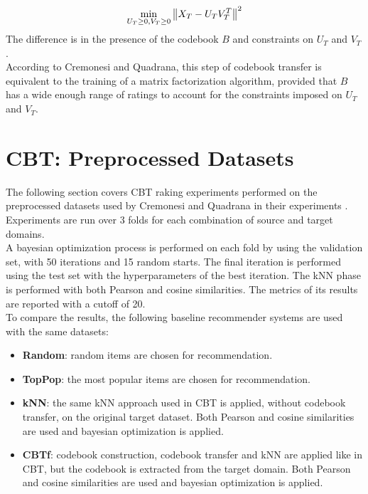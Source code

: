 \begin{equation*}
\min_{U_T \geq 0, V_T \geq 0} \left\lVert X_T - U_T V_T^T\right\rVert^2
\end{equation*}
The difference is in the presence of the codebook $B$ and constraints on $U_T$ and $V_T$.\\
According to Cremonesi and Quadrana, this step of codebook transfer is equivalent to the training of a matrix factorization algorithm, provided that $B$ has a wide enough range of ratings to account for the constraints imposed on $U_T$ and $V_T$.



\section{CBT: Preprocessed Datasets}

The following section covers CBT raking experiments performed on the preprocessed datasets used by Cremonesi and Quadrana in their experiments \cite{10.1145/2645710.2645769}.\\
Experiments are run over 3 folds for each combination of source and target domains.\\
A bayesian optimization process is performed on each fold by using the validation set, with 50 iterations and 15 random starts. The final iteration is performed using the test set with the hyperparameters of the best iteration. The kNN phase is performed with both Pearson and cosine similarities. The metrics of its results are reported with a cutoff of 20.\\
To compare the results, the following baseline recommender systems are used with the same datasets:
\begin{itemize}
\item \textbf{Random}: random items are chosen for recommendation.
\item \textbf{TopPop}: the most popular items are chosen for recommendation.
\item \textbf{kNN}: the same kNN approach used in CBT is applied, without codebook transfer, on the original target dataset. Both Pearson and cosine similarities are used and bayesian optimization is applied.
\item \textbf{CBTf}: codebook construction, codebook transfer and kNN are applied like in CBT, but the codebook is extracted from the target domain. Both Pearson and cosine similarities are used and bayesian optimization is applied.
\end{itemize}


